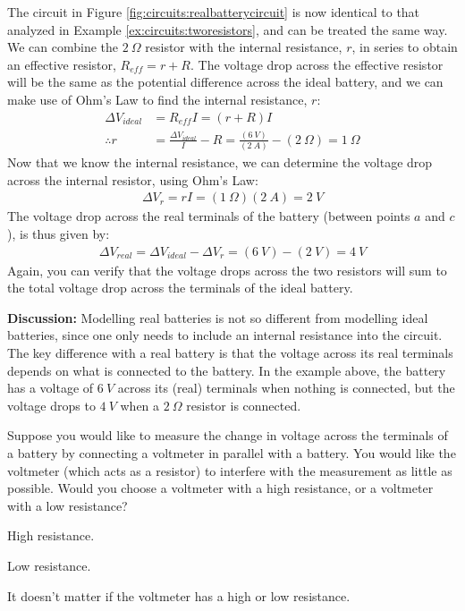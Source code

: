 \begin{example}
The circuit in Figure \ref{fig:circuits:realbatterycircuit} is now identical to that analyzed in Example \ref{ex:circuits:tworesistors}, and can be treated the same way. We can combine the $\SI{2}{\Omega}$ resistor with the internal resistance, $r$, in series to obtain an effective resistor, $R_{eff}=r+R$. The voltage drop across the effective resistor will be the same as the potential difference across the ideal battery, and we can make use of Ohm's Law to find the internal resistance, $r$:
\begin{align*}
\Delta V_{ideal}&= R_{eff}I=(r+R)I\\
\therefore r &= \frac{\Delta V_{ideal}}{I}-R=\frac{(\SI{6}{V})}{(\SI{2}{A})}-(\SI{2}{\Omega})=\SI{1}{\Omega}
\end{align*}
Now that we know the internal resistance, we can determine the voltage drop across the internal resistor, using Ohm's Law:
\begin{align*}
\Delta V_r = rI=(\SI{1}{\Omega})(\SI{2}{A})=\SI{2}{V}
\end{align*}
The voltage drop across the real terminals of the battery (between points $a$ and $c$), is thus given by:
\begin{align*}
\Delta V_{real}=\Delta V_{ideal}-\Delta V_r=(\SI{6}{V})-(\SI{2}{V})=\SI{4}{V}
\end{align*}
Again, you can verify that the voltage drops across the two resistors will sum to the total voltage drop across the terminals of the ideal battery. 


\textbf{Discussion: } Modelling real batteries is not so different from modelling ideal batteries, since one only needs to include an internal resistance into the circuit. The key difference with a real battery is that the voltage across its real terminals depends on what is connected to the battery. In the example above, the battery has a voltage of $\SI{6}{V}$ across its (real) terminals when nothing is connected, but the voltage drops to $\SI{4}{V}$ when a $\SI{2}{\Omega}$ resistor is connected.
\end{example}


\begin{checkpoint}{}
	\begin{MCquestion}{Suppose you would like to measure the change in voltage across the terminals of a battery by connecting a voltmeter in parallel with a battery. You would like the voltmeter (which acts as a resistor) to interfere with the measurement as little as possible. Would you choose a voltmeter with a high resistance, or a voltmeter with a low resistance?}
		\item High resistance. \correct
		\item Low resistance.
		\item It doesn't matter if the voltmeter has a high or low resistance.
	\end{MCquestion}
\end{checkpoint}

